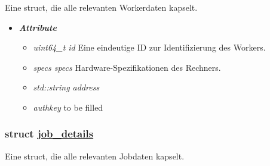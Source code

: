 \documentclass[a4paper,12pt]{article}
\newcommand\purl[1]{\protect\url{#1}}
\begin{document}
Eine struct, die alle relevanten Workerdaten kapselt.


\begin{itemize}[label={}]

	\item \textit{\textbf{Attribute}}
		\begin{itemize}[label={\textbullet}]
			\item \textit{uint64\_t id} Eine eindeutige ID zur Identifizierung des Workers.
			
			\item \textit{specs specs} Hardware-Spezifikationen des Rechners.
			
			\item \textit{std::string address}
			
			\item \textit{authkey} to be filled
		\end{itemize}


\end{itemize}
\clearpage

\subsubsection{struct \purl{job_details}}

Eine struct, die alle relevanten Jobdaten kapselt.
\end{document}
